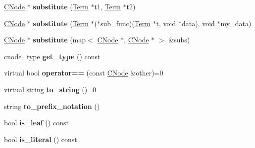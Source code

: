 \begin{DoxyCompactItemize}
\item 
\hypertarget{classCNode_aa6c73cd96659f601a7477f1faad7affc}{\hyperlink{classCNode}{\-C\-Node} $\ast$ {\bfseries substitute} (\hyperlink{classTerm}{\-Term} $\ast$t1, \hyperlink{classTerm}{\-Term} $\ast$t2)}\label{classCNode_aa6c73cd96659f601a7477f1faad7affc}

\item 
\hypertarget{classCNode_a05a2e1e7856e0dd08bfcdbeb931b3314}{\hyperlink{classCNode}{\-C\-Node} $\ast$ {\bfseries substitute} (\hyperlink{classTerm}{\-Term} $\ast$($\ast$sub\-\_\-func)(\hyperlink{classTerm}{\-Term} $\ast$t, void $\ast$data), void $\ast$my\-\_\-data)}\label{classCNode_a05a2e1e7856e0dd08bfcdbeb931b3314}

\item 
\hypertarget{classCNode_a1d307f77bff582d014e8744f01dd3590}{\hyperlink{classCNode}{\-C\-Node} $\ast$ {\bfseries substitute} (map$<$ \hyperlink{classCNode}{\-C\-Node} $\ast$, \hyperlink{classCNode}{\-C\-Node} $\ast$ $>$ \&subs)}\label{classCNode_a1d307f77bff582d014e8744f01dd3590}

\item 
\hypertarget{classCNode_aa05994b70eb79ef5e710d9701915ddea}{cnode\-\_\-type {\bfseries get\-\_\-type} () const }\label{classCNode_aa05994b70eb79ef5e710d9701915ddea}

\item 
\hypertarget{classCNode_a7aa6de21240ebf7cc484eb4758c99d77}{virtual bool {\bfseries operator==} (const \hyperlink{classCNode}{\-C\-Node} \&other)=0}\label{classCNode_a7aa6de21240ebf7cc484eb4758c99d77}

\item 
\hypertarget{classCNode_a306eb6bd36cdd5ae4d792b6707bb638c}{virtual string {\bfseries to\-\_\-string} ()=0}\label{classCNode_a306eb6bd36cdd5ae4d792b6707bb638c}

\item 
\hypertarget{classCNode_a44d94a128de88cbe26383459cc4473b3}{string {\bfseries to\-\_\-prefix\-\_\-notation} ()}\label{classCNode_a44d94a128de88cbe26383459cc4473b3}

\item 
\hypertarget{classCNode_a27715dd1f5669edcb611e50504043b7f}{bool {\bfseries is\-\_\-leaf} () const }\label{classCNode_a27715dd1f5669edcb611e50504043b7f}

\item 
\hypertarget{classCNode_a85bb30e59b95ddcf540d95c343496d35}{bool {\bfseries is\-\_\-literal} () const }\label{classCNode_a85bb30e59b95ddcf540d95c343496d35}


\end{DoxyCompactItemize}
